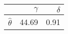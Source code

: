 \begin{tabular}{lrr}
\toprule
 & $\gamma$ & $\delta$ \\
\midrule
$\hat{\theta}$ & 44.69 & 0.91 \\
\bottomrule
\end{tabular}
